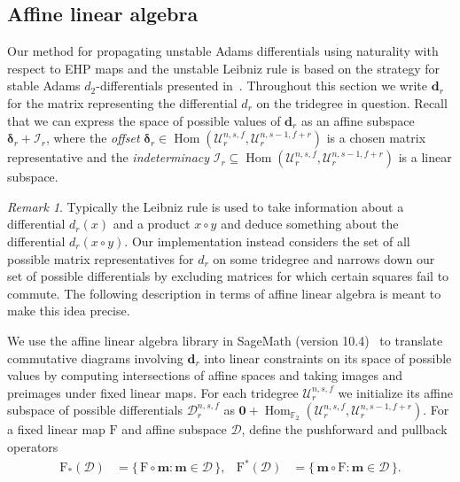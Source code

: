 \documentclass[dvipsnames,table]{amsart}
\theoremstyle{definition}
\theoremstyle{remark}
\newtheorem*{remark*}{Remark}
\numberwithin{equation}{section}
\begin{document}
\subsection{Affine linear algebra}Our method for propagating unstable Adams differentials using naturality with respect to EHP maps and the unstable Leibniz rule is based on the strategy for stable Adams $d_2$-differentials presented in~\cite{Beauvais_Feisthauer_2022}. Throughout this section we write $\mathbf{d}_r$ for the matrix representing the differential $d_r$ on the tridegree in question. Recall that we can express the space of possible values of $\mathbf{d}_r$ as an affine subspace $\boldsymbol{\delta}_r + \mathcal{I}_r$, where the \emph{offset} $\boldsymbol{\delta}_r \in \operatorname{Hom}(\mathcal{U}_r^{n,s,f}, \mathcal{U}_r^{n,s-1,f+r})$ is a chosen matrix representative and the \emph{indeterminacy} $\mathcal{I}_r \subseteq \operatorname{Hom}(\mathcal{U}_r^{n,s,f}, \mathcal{U}_r^{n,s-1,f+r})$ is a linear subspace.  
\begin{remark*}
  Typically the Leibniz rule is used to take information about a differential $d_r(x)$ and a product $x \circ y$ and deduce something about the differential $d_r(x \circ y)$. Our implementation instead considers the set of all possible matrix representatives for $d_r$ on some tridegree and narrows down our set of possible differentials by excluding matrices for which certain squares fail to commute. The following description in terms of affine linear algebra is meant to make this idea precise.
\end{remark*}
We use the affine linear algebra library in SageMath (version 10.4)~\cite{SageMath} to translate commutative
diagrams involving $\mathbf{d}_r$ into linear constraints on its space of
possible values by computing intersections of affine spaces and taking images
and preimages under fixed linear maps. For each tridegree
$\mathcal{U}_r^{n,s,f}$ we initialize its affine subspace of possible
differentials $\mathcal{D}_r^{n,s,f}$ as $\mathbf{0} +
\operatorname{Hom}_{\mathbb{F}_2}(\mathcal{U}_r^{n,s,f}, \mathcal{U}_r^{n,s-1,f+r})$. For a fixed linear map $\mathrm{F}$ and affine subspace $\mathcal{D}$, define the pushforward and pullback operators
\begin{align*}
  \mathrm{F}_*(\mathcal{D}) &= \{\,\mathrm{F}\circ\mathbf{m} : \mathbf{m} \in \mathcal{D}\,\},
  &
  \mathrm{F}^*(\mathcal{D}) &= \{\,\mathbf{m}\circ\mathrm{F} : \mathbf{m} \in \mathcal{D}\,\}.
\end{align*}
\end{document}
